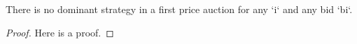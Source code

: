 \begin{theorem}\label{first_price_has_no_dominant_strategy}
    \leanok
    There is no dominant strategy in a first price auction for any `i` and any bid `bi`.
\end{theorem}
\begin{proof}
    Here is a proof.
\end{proof}


















